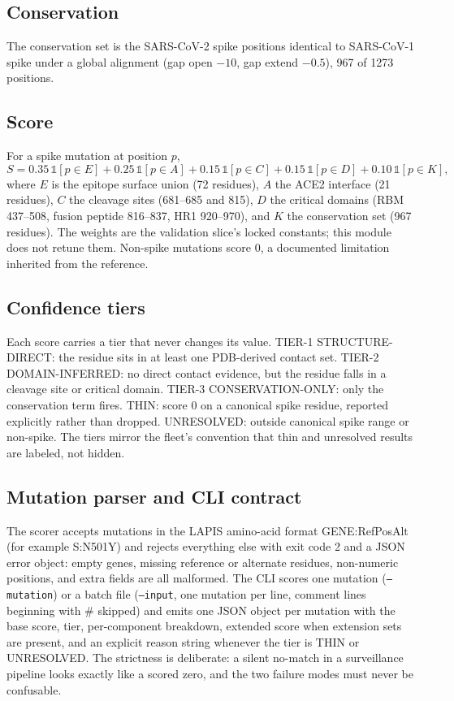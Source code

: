 \documentclass[11pt]{article}
\begin{document}
{\small}

\subsection{Conservation}
The conservation set is the SARS-CoV-2 spike positions identical to SARS-CoV-1 spike under a global alignment (gap open $-10$, gap extend $-0.5$), 967 of 1273 positions.

\subsection{Score}
For a spike mutation at position $p$,
\[
S = 0.35\,\mathbb{1}[p \in E] + 0.25\,\mathbb{1}[p \in A] + 0.15\,\mathbb{1}[p \in C] + 0.15\,\mathbb{1}[p \in D] + 0.10\,\mathbb{1}[p \in K],
\]
where $E$ is the epitope surface union (72 residues), $A$ the ACE2 interface (21 residues), $C$ the cleavage sites (681--685 and 815), $D$ the critical domains (RBM 437--508, fusion peptide 816--837, HR1 920--970), and $K$ the conservation set (967 residues). The weights are the validation slice's locked constants; this module does not retune them. Non-spike mutations score 0, a documented limitation inherited from the reference.

\subsection{Confidence tiers}
Each score carries a tier that never changes its value. TIER-1 STRUCTURE-DIRECT: the residue sits in at least one PDB-derived contact set. TIER-2 DOMAIN-INFERRED: no direct contact evidence, but the residue falls in a cleavage site or critical domain. TIER-3 CONSERVATION-ONLY: only the conservation term fires. THIN: score 0 on a canonical spike residue, reported explicitly rather than dropped. UNRESOLVED: outside canonical spike range or non-spike. The tiers mirror the fleet's convention that thin and unresolved results are labeled, not hidden.

\subsection{Mutation parser and CLI contract}
The scorer accepts mutations in the LAPIS amino-acid format GENE:RefPosAlt (for example S:N501Y) and rejects everything else with exit code 2 and a JSON error object: empty genes, missing reference or alternate residues, non-numeric positions, and extra fields are all malformed. The CLI scores one mutation (\texttt{--mutation}) or a batch file (\texttt{--input}, one mutation per line, comment lines beginning with \# skipped) and emits one JSON object per mutation with the base score, tier, per-component breakdown, extended score when extension sets are present, and an explicit reason string whenever the tier is THIN or UNRESOLVED. The strictness is deliberate: a silent no-match in a surveillance pipeline looks exactly like a scored zero, and the two failure modes must never be confusable.
\end{document}
